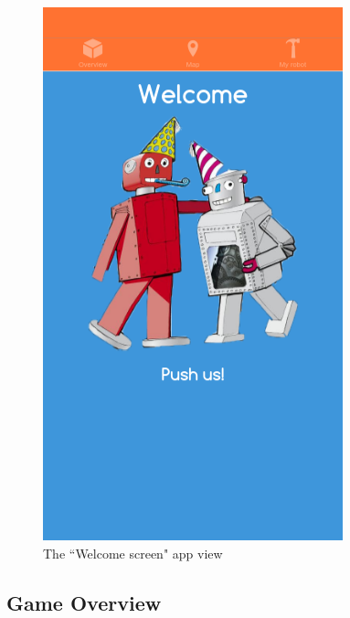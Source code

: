 \begin{figure}[H]
\begin{minipage}[t]{0.35\textwidth}
    \includegraphics[width=\textwidth]{images/app/welcomeScreen.png}
    \caption{The ``Welcome screen" app view}
    \label{fig:welcome_screen}
  \end{minipage}
\end{figure}

\subsection{Game Overview}

